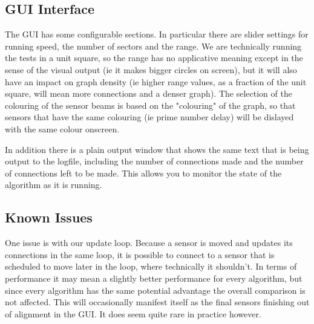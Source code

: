 \subsection{GUI Interface}
The GUI has some configurable sections. In particular there are slider settings for running speed, the number of sectors and the range. We are technically running the tests in a unit square, so the range has no applicative meaning except in the sense of the visual output (ie it makes bigger circles on screen), but it will also have an impact on graph density (ie higher range values, as a fraction of the unit square, will mean more connections and a denser graph). The selection of the colouring of the sensor beams is based on the "colouring" of the graph, so that sensors that have the same colouring (ie prime number delay) will be dislayed with the same colour onscreen.

In addition there is a plain output window that shows the same text that is being output to the logfile, including the number of connections made and the number of connections left to be made. This allows you to monitor the state of the algorithm as it is running.

\subsection{Known Issues}
One issue is with our update loop. Because a sensor is moved and updates its connections in the same loop, it is possible to connect to a sensor that is scheduled to move later in the loop, where technically it shouldn't. In terms of performance it may mean a slightly better performance for every algorithm, but since every algorithm has the same potential advantage the overall comparison is not affected. This will occasionally manifest itself as the final sensors finishing out of alignment in the GUI. It does seem quite rare in practice however.
 